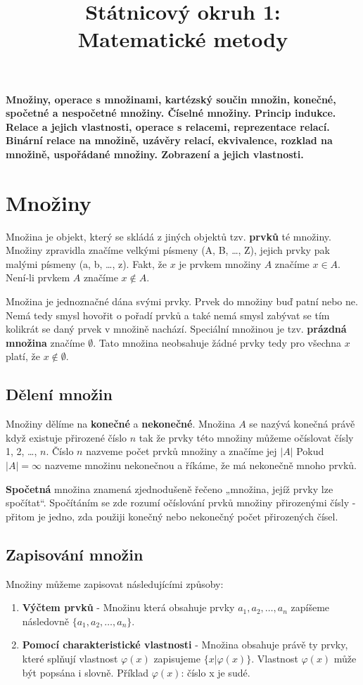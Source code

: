 \documentclass[12pt,a4paper]{article}
\begin{document}
\title{Státnicový okruh 1: \\ Matematické metody}
\maketitle
\newpage
\tableofcontents
\newpage
\textbf{Množiny, operace s množinami, kartézský součin množin, konečné, spočetné a nespočetné množiny. Číselné
množiny. Princip indukce. Relace a jejich vlastnosti, operace s relacemi, reprezentace relací. Binární relace na
množině, uzávěry relací, ekvivalence, rozklad na množině, uspořádané množiny. Zobrazení a jejich vlastnosti.}

\section{Množiny}
Množina je objekt, který se skládá z jiných objektů tzv. \textbf{prvků} té množiny. Množiny zpravidla značíme velkými písmeny (A, B, \dots, Z), jejich prvky pak malými písmeny (a, b, \dots, z). Fakt, že $x$ je prvkem množiny $A$ značíme $x \in A$. Není-li prvkem $A$ značíme $x \not\in A$.

Množina je jednoznačné dána svými prvky. Prvek do množiny buď patní nebo ne. Nemá tedy smysl hovořit o pořadí prvků a také nemá smysl zabývat se tím kolikrát se daný prvek v množině nachází.
Speciální množinou je tzv. \textbf{prázdná množina} značíme $\emptyset$. Tato množina neobsahuje žádné prvky tedy pro všechna $x$ platí, že $x \not\in \emptyset$.

\subsection{Dělení množin}
Množiny dělíme na \textbf{konečné} a \textbf{nekonečné}. Množina $A$ se nazývá konečná právě když existuje přirozené číslo $n$ tak že prvky této množiny můžeme očíslovat čísly 1, 2, \dots, $n$. Číslo $n$ nazveme počet prvků množiny a značíme jej $|A|$
Pokud $|A| = \infty$ nazveme množinu nekonečnou a říkáme, že má nekonečně mnoho prvků.

\textbf{Spočetná} množina znamená zjednodušeně řečeno „množina, jejíž prvky lze spočítat“. Spočítáním se zde rozumí očíslování prvků množiny přirozenými čísly - přitom je jedno, zda použiji konečný nebo nekonečný počet přirozených čísel.

\subsection{Zapisování množin}
Množiny můžeme zapisovat následujícími způsoby:
\begin{enumerate}
	\item \textbf{Výčtem prvků} - Množinu která obsahuje prvky $a_1,a_2,\dots,a_n$ zapíšeme následovně $\{a_1,a_2,\dots,a_n\}$.
	\item \textbf{Pomocí charakteristické vlastnosti} - Množina obsahuje právě ty prvky, které splňují vlastnost $\varphi(x)$ zapisujeme $\{x | \varphi(x)\}$. Vlastnost $\varphi(x)$ může být popsána i slovně. Příklad $\varphi(x)$: číslo x je sudé.
\end{enumerate}
\end{document}
